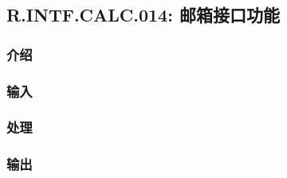 \subsection{R.INTF.CALC.014: 邮箱接口功能}
\subsubsection{介绍}
\subsubsection{输入}
\subsubsection{处理}
\subsubsection{输出}